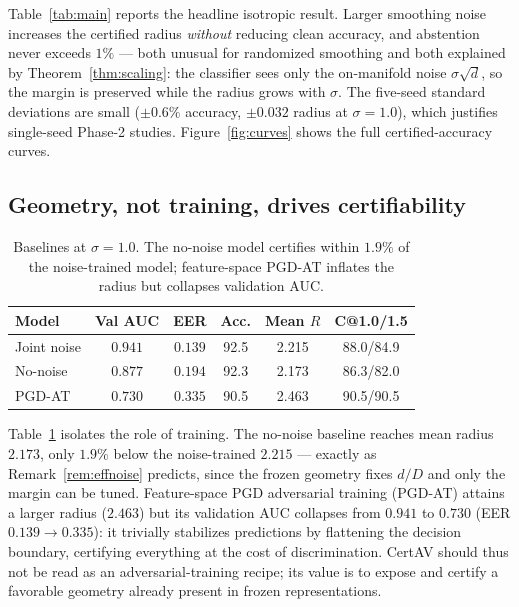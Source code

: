 Table~\ref{tab:main} reports the headline isotropic result. Larger smoothing noise increases the certified radius \emph{without} reducing clean accuracy, and abstention never exceeds $1\%$ --- both unusual for randomized smoothing and both explained by Theorem~\ref{thm:scaling}: the classifier sees only the on-manifold noise $\sigma\sqrt{d}$, so the margin is preserved while the radius grows with $\sigma$. The five-seed standard deviations are small ($\pm0.6\%$ accuracy, $\pm0.032$ radius at $\sigma=1.0$), which justifies single-seed Phase-2 studies. Figure~\ref{fig:curves} shows the full certified-accuracy curves.

\subsection{Geometry, not training, drives certifiability}

\begin{table}[t]
\centering
\caption{Baselines at $\sigma=1.0$. The no-noise model certifies within $1.9\%$ of the noise-trained model; feature-space PGD-AT inflates the radius but collapses validation AUC.}
\label{tab:baselines}
\footnotesize
\setlength{\tabcolsep}{3.2pt}
\begin{tabular}{lccccc}
\toprule
Model & Val AUC & EER & Acc. & Mean $R$ & C@1.0/1.5 \\
\midrule
Joint noise & $0.941$ & $0.139$ & 92.5 & 2.215 & 88.0/84.9 \\
No-noise & $0.877$ & $0.194$ & 92.3 & 2.173 & 86.3/82.0 \\
PGD-AT & $0.730$ & $0.335$ & 90.5 & 2.463 & 90.5/90.5 \\
\bottomrule
\end{tabular}
\end{table}

Table~\ref{tab:baselines} isolates the role of training. The no-noise baseline reaches mean radius $2.173$, only $1.9\%$ below the noise-trained $2.215$ --- exactly as Remark~\ref{rem:effnoise} predicts, since the frozen geometry fixes $d/D$ and only the margin can be tuned. Feature-space PGD adversarial training (PGD-AT) attains a larger radius ($2.463$) but its validation AUC collapses from $0.941$ to $0.730$ (EER $0.139\!\to\!0.335$): it trivially stabilizes predictions by flattening the decision boundary, certifying everything at the cost of discrimination. CertAV should thus not be read as an adversarial-training recipe; its value is to expose and certify a favorable geometry already present in frozen representations.


